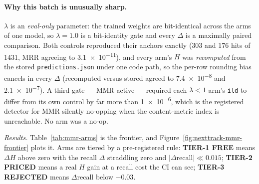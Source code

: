 \documentclass[11pt]{article}
\begin{document}
\paragraph{Why this batch is unusually sharp.} $\lambda$ is an \emph{eval-only}
parameter: the trained weights are bit-identical across the arms of one model, so
$\lambda=\num{1.0}$ is a bit-identity gate and every $\Delta$ is a maximally
paired comparison. Both controls reproduced their anchors exactly (\num{303} and
\num{176} hits of \num{1431}, MRR agreeing to \num{3.1e-11}), and every arm's $H$
was \emph{recomputed} from the stored \texttt{predictions.json} under one code
path, so the per-row rounding bias cancels in every $\Delta$ (recomputed versus
stored agreed to \num{7.4e-8} and \num{2.1e-7}). A third gate --- MMR-active ---
required each $\lambda<1$ arm's \texttt{ild} to differ from its own control by far
more than \num{1e-6}, which is the registered detector for MMR silently no-opping
when the content-metric index is unreachable. No arm was a no-op.

\emph{Results.} Table~\ref{tab:mmr-arms} is the frontier, and
Figure~\ref{fig:nexttrack-mmr-frontier} plots it. Arms are tiered by a
pre-registered rule: \textbf{TIER-1 FREE} means $\Delta H$ above zero with the
recall $\Delta$ straddling zero and $|\Delta\text{recall}| \ll \num{0.015}$;
\textbf{TIER-2 PRICED} means a real $H$ gain at a recall cost the CI can see;
\textbf{TIER-3 REJECTED} means $\Delta$recall below $-\num{0.03}$.
\end{document}
